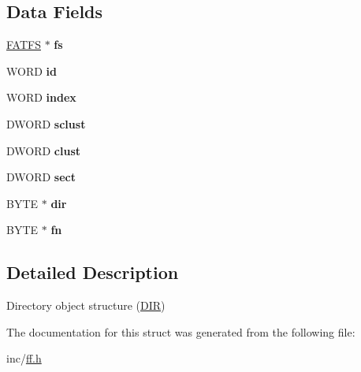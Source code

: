 \subsection*{Data Fields}
\begin{DoxyCompactItemize}
\item 
\hyperlink{structFATFS}{F\+A\+T\+FS} $\ast$ {\bfseries fs}\hypertarget{structDIR_a312eaa66cb703fb2993ea98173dc0c9a}{}\label{structDIR_a312eaa66cb703fb2993ea98173dc0c9a}

\item 
W\+O\+RD {\bfseries id}\hypertarget{structDIR_aca2c95a99a04173917ec70c030891383}{}\label{structDIR_aca2c95a99a04173917ec70c030891383}

\item 
W\+O\+RD {\bfseries index}\hypertarget{structDIR_ab95119fbacbe45e3e9ee0f962b844092}{}\label{structDIR_ab95119fbacbe45e3e9ee0f962b844092}

\item 
D\+W\+O\+RD {\bfseries sclust}\hypertarget{structDIR_a9212af5877b94d790dd3bab3aa320994}{}\label{structDIR_a9212af5877b94d790dd3bab3aa320994}

\item 
D\+W\+O\+RD {\bfseries clust}\hypertarget{structDIR_acfbb8ba2d6e73b6f999ceffd1857c190}{}\label{structDIR_acfbb8ba2d6e73b6f999ceffd1857c190}

\item 
D\+W\+O\+RD {\bfseries sect}\hypertarget{structDIR_ad01fcc812ed0dad11a593574336adc9e}{}\label{structDIR_ad01fcc812ed0dad11a593574336adc9e}

\item 
B\+Y\+TE $\ast$ {\bfseries dir}\hypertarget{structDIR_a6c2a8c0cf2d55ae99775e93a16593449}{}\label{structDIR_a6c2a8c0cf2d55ae99775e93a16593449}

\item 
B\+Y\+TE $\ast$ {\bfseries fn}\hypertarget{structDIR_a32da2f31d6c3b6c42eef981cb0cfd2ee}{}\label{structDIR_a32da2f31d6c3b6c42eef981cb0cfd2ee}

\end{DoxyCompactItemize}


\subsection{Detailed Description}
Directory object structure (\hyperlink{structDIR}{D\+IR}) 

The documentation for this struct was generated from the following file\+:\begin{DoxyCompactItemize}
\item 
inc/\hyperlink{ff_8h}{ff.\+h}\end{DoxyCompactItemize}

